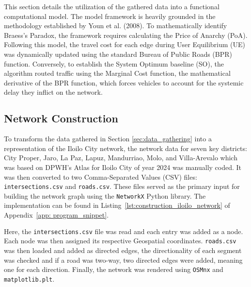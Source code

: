 This section details the utilization of the gathered data into a functional computational model. The model framework is heavily grounded in the methodology established by Youn et al. (2008). To mathematically identify Braess's Paradox, the framework requires calculating the Price of Anarchy (PoA). Following this model, the travel cost for each edge during User Equilibrium (UE) was dynamically updated using the standard Bureau of Public Roads (BPR) function. Conversely, to establish the System Optimum baseline (SO), the algorithm routed traffic using the Marginal Cost function, the mathematical derivative of the BPR function, which forces vehicles to account for the systemic delay they inflict on the network.

\subsection{Network Construction}
\label{sec:network_construction}
To transform the data gathered in Section \ref{sec:data_gathering} into a representation of the Iloilo City network, the network data for seven key districts: City Proper, Jaro, La Paz, Lapuz, Mandurriao, Molo, and Villa-Arevalo which was based on DPWH's Atlas for Iloilo City of year 2024 was manually coded. It was then converted to two Comma-Separated Values (CSV) files: \texttt{intersections.csv} and \texttt{roads.csv}. These files served as the primary input for building the network graph using the \texttt{NetworkX} Python library. The implementation can be found in Listing~\ref{lst:construction_iloilo_network} of Appendix~\ref{app: program_snippet}.



Here, the \texttt{intersections.csv} file was read and each entry was added as a node. Each node was then assigned its respective Geospatial coordinates. \texttt{roads.csv} was then loaded and added as directed edges, the directionality of each segment was checked and if a road was two-way, two directed edges were added, meaning one for each direction. Finally, the network was rendered using \texttt{OSMnx} and \texttt{matplotlib.plt}. 


